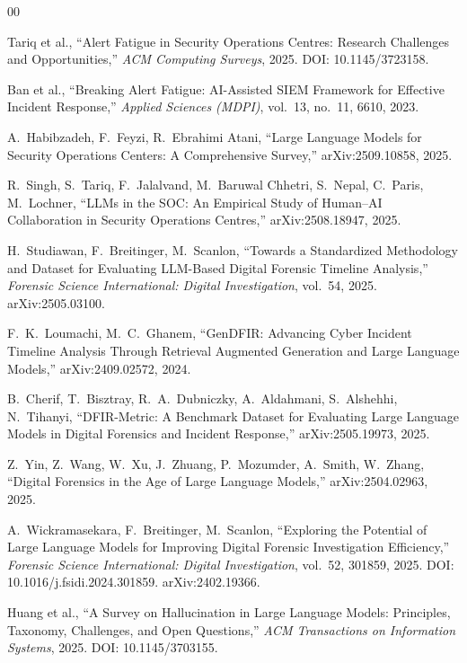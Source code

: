 \documentclass[conference]{IEEEtran}
\begin{document}
\begin{thebibliography}{00}

Tariq et al.,
``Alert Fatigue in Security Operations Centres: Research Challenges and Opportunities,''
\textit{ACM Computing Surveys}, 2025.
DOI: 10.1145/3723158.

Ban et al.,
``Breaking Alert Fatigue: AI-Assisted SIEM Framework for Effective Incident Response,''
\textit{Applied Sciences (MDPI)}, vol.~13, no.~11, 6610, 2023.

A.~Habibzadeh, F.~Feyzi, R.~Ebrahimi Atani,
``Large Language Models for Security Operations Centers: A Comprehensive Survey,''
arXiv:2509.10858, 2025.

R.~Singh, S.~Tariq, F.~Jalalvand, M.~Baruwal Chhetri, S.~Nepal, C.~Paris, M.~Lochner,
``LLMs in the SOC: An Empirical Study of Human--AI Collaboration in Security Operations Centres,''
arXiv:2508.18947, 2025.

H.~Studiawan, F.~Breitinger, M.~Scanlon,
``Towards a Standardized Methodology and Dataset for Evaluating LLM-Based Digital Forensic Timeline Analysis,''
\textit{Forensic Science International: Digital Investigation}, vol.~54, 2025.
arXiv:2505.03100.

F.~K.~Loumachi, M.~C.~Ghanem,
``GenDFIR: Advancing Cyber Incident Timeline Analysis Through Retrieval Augmented Generation and Large Language Models,''
arXiv:2409.02572, 2024.

B.~Cherif, T.~Bisztray, R.~A.~Dubniczky, A.~Aldahmani, S.~Alshehhi, N.~Tihanyi,
``DFIR-Metric: A Benchmark Dataset for Evaluating Large Language Models in Digital Forensics and Incident Response,''
arXiv:2505.19973, 2025.

Z.~Yin, Z.~Wang, W.~Xu, J.~Zhuang, P.~Mozumder, A.~Smith, W.~Zhang,
``Digital Forensics in the Age of Large Language Models,''
arXiv:2504.02963, 2025.

A.~Wickramasekara, F.~Breitinger, M.~Scanlon,
``Exploring the Potential of Large Language Models for Improving Digital Forensic Investigation Efficiency,''
\textit{Forensic Science International: Digital Investigation}, vol.~52, 301859, 2025.
DOI: 10.1016/j.fsidi.2024.301859.
arXiv:2402.19366.

Huang et al.,
``A Survey on Hallucination in Large Language Models: Principles, Taxonomy, Challenges, and Open Questions,''
\textit{ACM Transactions on Information Systems}, 2025.
DOI: 10.1145/3703155.


\end{thebibliography}
\end{document}
